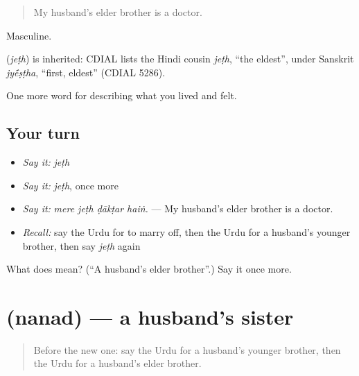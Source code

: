 \begin{quote}
My husband's elder brother is a doctor.
\end{quote}

Masculine.

\begin{cousinweb}
\textbf{} (\emph{jeṭh}) is inherited: CDIAL lists the Hindi cousin \emph{jeṭh}, \textquotedblleft{}the eldest\textquotedblright{}, under Sanskrit \emph{jy\'{\={e}}ṣṭha}, \textquotedblleft{}first, eldest\textquotedblright{} (CDIAL 5286).
\end{cousinweb}

\begin{grammarlens}[title={What you've built}]
One more word for describing what you lived and felt.
\end{grammarlens}

\subsection*{Your turn}
\begin{itemize}
\raggedright
  \item \emph{Say it:} \emph{jeṭh}
  \item \emph{Say it:} \emph{jeṭh}, once more
  \item \emph{Say it:} \emph{mere jeṭh ḍākṭar haiṅ.} — My husband's elder brother is a doctor.
  \item \emph{Recall:} say the Urdu for to marry off, then the Urdu for a husband's younger brother, then say \emph{jeṭh} again
\end{itemize}

\begin{tcolorbox}[breakable,colback=teal!4,colframe=teal!35!black,title={Before you move on}]
What does  mean? (\textquotedblleft{}A husband's elder brother\textquotedblright{}.) Say it once more.
\end{tcolorbox}
\section[\texorpdfstring{\ur{نند} (nanad)}{نند (nanad)}]{ (nanad) — a husband's sister}

\label{lesson:UR-C489-nanad}



\begin{quote}
Before the new one: say the Urdu for a husband's younger brother, then the Urdu for a husband's elder brother.
\end{quote}

